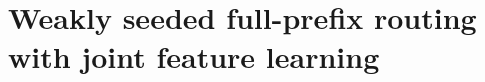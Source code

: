 %
%
%

\providecommand{\LRstep}{L_{\mathrm{step}}}
\providecommand{\LRout}{L_{\mathrm{out}}}
\providecommand{\LRsig}{\sigma}
\providecommand{\LRnorm}[1]{\left\lVert #1\right\rVert}
\providecommand{\LRinner}[2]{\left\langle #1,#2\right\rangle}
\theoremstyle{plain}
\newtheorem{lrlemma}[lemma]{Lemma}
\newtheorem{lrproposition}[proposition]{Proposition}
\newtheorem{lrtheorem}[theorem]{Theorem}
\newtheorem{lrremark}[remark]{Remark}

\section{Weakly seeded full-prefix routing with joint feature learning}
\label{app:weak-seeded-full-prefix-routing}

